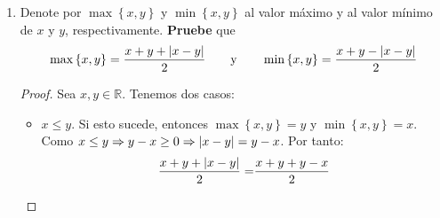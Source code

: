 \documentclass[12pt]{article}
\begin{document}
\begin{enumerate}
\begin{proof}
\begin{equation*}
            X = \left\{x\in\mathbb{R}|0<x<1\textup{ o }3<x\right\}
        \end{equation*}
        De (VIII): Observemos que:
        \begin{equation*}
            \begin{split}
                \abs{x^2-x}\leq1\iff&-1\leq x^2-x\leq1\\
                \iff&-1+\frac{1}{4}\leq x^2-x+\frac{1}{4}\leq1+\frac{1}{4}\\
                \iff&-\frac{3}{4}\leq \left(x-\frac{1}{2}\right)^2\leq \frac{5}{4}\\
                \iff&0\leq \left(x-\frac{1}{2}\right)^2\leq \frac{5}{4}\\
                \iff&\abs{x-\frac{1}{2}}\leq \frac{\sqrt{5}}{2}\\
                \iff&-\frac{\sqrt{5}}{2}\leq x-\frac{1}{2}\leq\frac{\sqrt{5}}{2}\\
                \iff&\frac{1-\sqrt{5}}{2}\leq x\leq\frac{1+\sqrt{5}}{2}
            \end{split}
        \end{equation*}
        Por lo tanto el conjunto de los $x$ que cumplen la desigualdad es:
        \begin{equation*}
            X = \left\{x\in\mathbb{R}\Big| \frac{1-\sqrt{5}}{2}\leq x\leq\frac{1+\sqrt{5}}{2}\right\}
        \end{equation*}
        \qed
    \end{proof}
    \item Denote por $\max\left\{x,y\right\}$ y $\min\left\{x,y\right\}$ al valor máximo y al valor mínimo de $x$ y $y$, respectivamente. \textbf{Pruebe} que
    \begin{equation*}
        \max\left\{x,y\right\} = \frac{x+y+\left| x-y \right|}{2} \qquad \textup{y} \qquad \min\left\{x,y\right\} = \frac{x+y-\left| x-y \right|}{2}
    \end{equation*}
    \begin{proof}
        Sea $x,y\in\mathbb{R}$. Tenemos dos casos:
        \begin{itemize}
            \item $x\leq y$. Si esto sucede, entonces $\max\left\{x,y\right\}=y$ y $\min\left\{x,y\right\}=x$. Como $x\leq y\Rightarrow y-x\geq0\Rightarrow\left| x-y \right|=y-x$. Por tanto:
            \begin{equation*}
                \begin{split}
                    \frac{x+y+\abs{x-y}}{2}=&\frac{x+y+y-x}{2}\\

\end{split}
\end{equation*}
\end{itemize}
\end{proof}
\end{enumerate}
\end{document}
